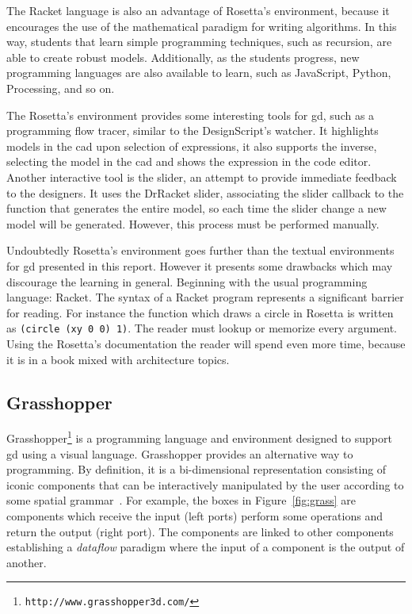 The Racket language is also an advantage of Rosetta's environment, because it encourages the use of the mathematical paradigm for writing algorithms. In this way, students that learn simple programming techniques, such as recursion, are able to create robust models. Additionally, as the students progress, new programming languages are also available to learn, such as JavaScript, Python, Processing, and so on.

The Rosetta's environment provides some interesting tools for \gls{gd}, such as a programming flow tracer, similar to the DesignScript's watcher. It highlights models in the \gls{cad} upon selection of expressions, it also supports the inverse, selecting the model in the \gls{cad} and shows the expression in the code editor. Another interactive tool is the slider, an attempt to provide immediate feedback to the designers. It uses the DrRacket slider, associating the slider callback to the function that generates the entire model, so each time the slider change a new model will be generated. However, this process must be performed manually.

Undoubtedly Rosetta's environment goes further than the textual environments for \gls{gd} presented in this report. However it presents some drawbacks which may discourage the learning in general. Beginning with the usual programming language: Racket. The syntax of a Racket program represents a significant barrier for reading. For instance the function which draws a circle in Rosetta is written as \texttt{(circle (xy 0 0) 1)}. The reader must lookup or memorize every argument. Using the Rosetta's documentation the reader will spend even more time, because it is in a book mixed with architecture topics.
\subsection{Grasshopper}
\label{subsec:grasshopper}
Grasshopper\footnote{\texttt{http://www.grasshopper3d.com/}} is a programming language and environment designed to support \gls{gd} using a visual language. Grasshopper provides an alternative way to programming. By definition, it is a bi-dimensional representation consisting of iconic components that can be interactively manipulated by the user according to some spatial grammar~\cite{myers1990taxonomies}. For example, the boxes in Figure~\ref{fig:grass} are components which receive the input (left ports) perform some operations and return the output (right port). The components are linked to other components establishing a \textit{dataflow} paradigm where the input of a component is the output of another.

